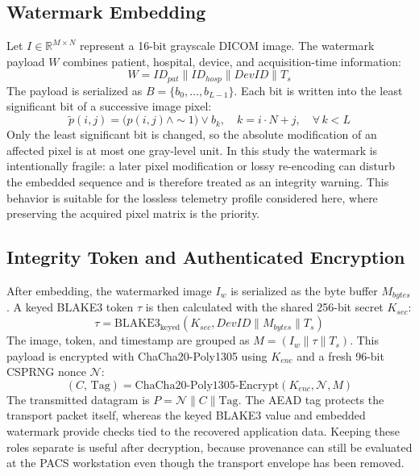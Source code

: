 \documentclass[runningheads]{llncs}
\begin{document}
\subsection{Watermark Embedding}
Let $I \in \mathbb{R}^{M \times N}$ represent a 16-bit grayscale DICOM image. The watermark payload $W$ combines patient, hospital, device, and acquisition-time information:
\begin{equation}
  W = ID_{pat} \parallel ID_{hosp} \parallel DevID \parallel T_s
\end{equation}
The payload is serialized as $B=\{b_0,\dots,b_{L-1}\}$. Each bit is written into the least significant bit of a successive image pixel:
\begin{equation}
  \tilde{p}(i,j) = \bigl(p(i,j) \land {\sim}1\bigr) \lor b_k, \quad k = i \cdot N + j, \quad \forall\,k < L
\end{equation}
Only the least significant bit is changed, so the absolute modification of an affected pixel is at most one gray-level unit. In this study the watermark is intentionally fragile: a later pixel modification or lossy re-encoding can disturb the embedded sequence and is therefore treated as an integrity warning. This behavior is suitable for the lossless telemetry profile considered here, where preserving the acquired pixel matrix is the priority.

\subsection{Integrity Token and Authenticated Encryption}
After embedding, the watermarked image $I_w$ is serialized as the byte buffer $M_{bytes}$. A keyed BLAKE3 token $\tau$ is then calculated with the shared 256-bit secret $K_{sec}$:
\begin{equation}
  \tau = \text{BLAKE3}_{\text{keyed}}(K_{sec}, DevID \parallel M_{bytes} \parallel T_s)
\end{equation}
The image, token, and timestamp are grouped as $M = (I_w \parallel \tau \parallel T_s)$. This payload is encrypted with ChaCha20-Poly1305 using $K_{enc}$ and a fresh 96-bit CSPRNG nonce $\mathcal{N}$:
\begin{equation}
  (C,\,\text{Tag}) = \text{ChaCha20-Poly1305-Encrypt}(K_{enc},\mathcal{N},M)
\end{equation}
The transmitted datagram is $P = \mathcal{N} \parallel C \parallel \text{Tag}$. The AEAD tag protects the transport packet itself, whereas the keyed BLAKE3 value and embedded watermark provide checks tied to the recovered application data. Keeping these roles separate is useful after decryption, because provenance can still be evaluated at the PACS workstation even though the transport envelope has been removed.
\end{document}
